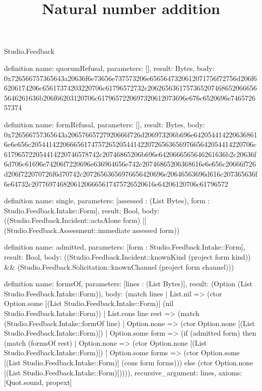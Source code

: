 \begin{lexlean}{Studio.Feedback}
\title{Natural number addition}
\begin{semanticmodule}
definition{
  name: quorumRefusal,
  parameters: [],
  result: Bytes,
  body: 0x726566757365643a20636f6e73656e737573206e6565647320612071756f72756d206f66206174206c65617374203220706c61796572732c20626563617573652074686520666565646261636b206f66203120706c6179657220697320612073696e676c6520696e746572657374
}

definition{
  name: formRefusal,
  parameters: [],
  result: Bytes,
  body: 0x726566757365643a20657665727920666f726d206973206b696e6420544142206368616e6e656c205441422066656174757265205441422072656365697665642054414220706c617965722054414220746578742c20746865206b696e6420666565646261636b2c20636f6d706c61696e74206f7220696e636964656e742c20746865206368616e6e656c20666f726d206f722070726f6d70742c20726563656976656420696e20646563696d616c207365636f6e64732c20776974682061206665617475726520616e64206120706c61796572
}

definition{
  name: single,
  parameters: [assessed : (List Bytes), form : Studio.Feedback.Intake::Form],
  result: Bool,
  body: ((Studio.Feedback.Incident::actsAlone form) || (Studio.Feedback.Assessment::immediate assessed form))
}

definition{
  name: admitted,
  parameters: [form : Studio.Feedback.Intake::Form],
  result: Bool,
  body: ((Studio.Feedback.Incident::knownKind (project form kind)) && (Studio.Feedback.Solicitation::knownChannel (project form channel)))
}

definition{
  name: formsOf,
  parameters: [lines : (List Bytes)],
  result: (Option (List Studio.Feedback.Intake::Form)),
  body: (match lines
    | List.nil => (ctor Option.some [(List Studio.Feedback.Intake::Form)] (nil Studio.Feedback.Intake::Form))
    | List.cons line rest => (match (Studio.Feedback.Intake::formOf line)
      | Option.none => (ctor Option.none [(List Studio.Feedback.Intake::Form)])
      | Option.some form => (if (admitted form) then (match (formsOf rest)
        | Option.none => (ctor Option.none [(List Studio.Feedback.Intake::Form)])
        | Option.some forms => (ctor Option.some [(List Studio.Feedback.Intake::Form)] (cons form forms))) else (ctor Option.none [(List Studio.Feedback.Intake::Form)])))),
  recursive_argument: lines,
  axioms: [Quot.sound, propext]
}


\end{semanticmodule}
\end{lexlean}
